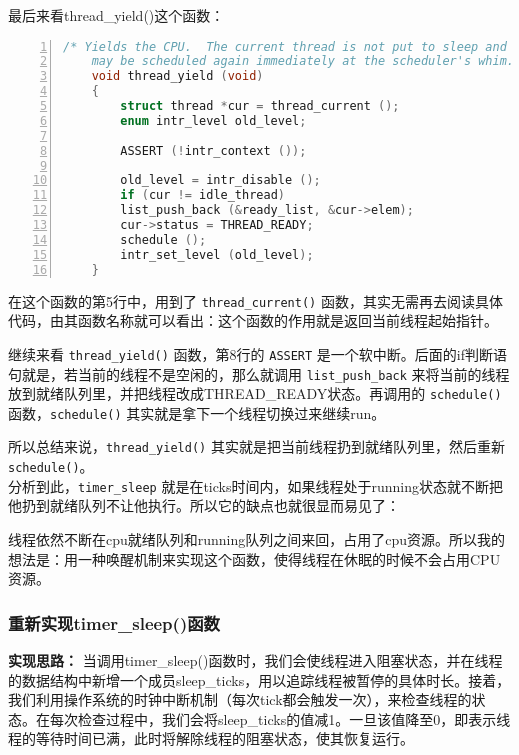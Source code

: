 \documentclass{article}
\begin{document}
	最后来看thread\_yield()这个函数：
		
	\begin{lstlisting}[xleftmargin = 4em,xrightmargin = 4em, aboveskip = 1em, numbers = left, language = C,title=\texttt{thread\_yield()}函数]
    /* Yields the CPU.  The current thread is not put to sleep and
    may be scheduled again immediately at the scheduler's whim. */
    void thread_yield (void)
    {
    	struct thread *cur = thread_current ();
    	enum intr_level old_level;
    	
    	ASSERT (!intr_context ());
    	
    	old_level = intr_disable ();
    	if (cur != idle_thread)
    	list_push_back (&ready_list, &cur->elem);
    	cur->status = THREAD_READY;
    	schedule ();
    	intr_set_level (old_level);
    }
	\end{lstlisting}
	
	在这个函数的第5行中，用到了 \texttt{thread\_current()} 函数，其实无需再去阅读具体代码，由其函数名称就可以看出：这个函数的作用就是返回当前线程起始指针。
	
	继续来看 \texttt{thread\_yield()} 函数，第8行的 \texttt{ASSERT} 是一个软中断。后面的if判断语句就是，若当前的线程不是空闲的，那么就调用 \texttt{list\_push\_back} 来将当前的线程放到就绪队列里，并把线程改成THREAD\_READY状态。再调用的 \texttt{schedule()} 函数，\texttt{schedule()} 其实就是拿下一个线程切换过来继续run。
	
	所以总结来说，\texttt{thread\_yield()} 其实就是把当前线程扔到就绪队列里，然后重新 \texttt{schedule()}。\\[1em]
	
	分析到此，\texttt{timer\_sleep} 就是在ticks时间内，如果线程处于running状态就不断把他扔到就绪队列不让他执行。所以它的缺点也就很显而易见了：
	
	线程依然不断在cpu就绪队列和running队列之间来回，占用了cpu资源。所以我的想法是：用一种唤醒机制来实现这个函数，使得线程在休眠的时候不会占用CPU资源。
	
	\subsubsection{重新实现timer\_sleep()函数}
	
	\textbf{实现思路：} 当调用timer\_sleep()函数时，我们会使线程进入阻塞状态，并在线程的数据结构中新增一个成员sleep\_ticks，用以追踪线程被暂停的具体时长。接着，我们利用操作系统的时钟中断机制（每次tick都会触发一次），来检查线程的状态。在每次检查过程中，我们会将sleep\_ticks的值减1。一旦该值降至0，即表示线程的等待时间已满，此时将解除线程的阻塞状态，使其恢复运行。
	
\end{document}
